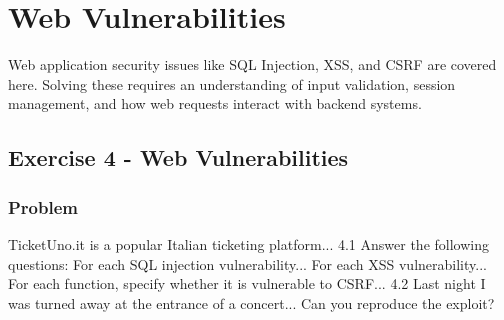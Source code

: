 \documentclass{article}
\begin{document}
\section{Web Vulnerabilities}
Web application security issues like SQL Injection, XSS, and CSRF are covered here. Solving these requires an understanding of input validation, session management, and how web requests interact with backend systems.

\subsection{Exercise 4 - Web Vulnerabilities}
\subsubsection*{Problem}
TicketUno.it is a popular Italian ticketing platform... 4.1 Answer the following questions: For each SQL injection vulnerability... For each XSS vulnerability... For each function, specify whether it is vulnerable to CSRF... 4.2 Last night I was turned away at the entrance of a concert... Can you reproduce the exploit?
\end{document}
